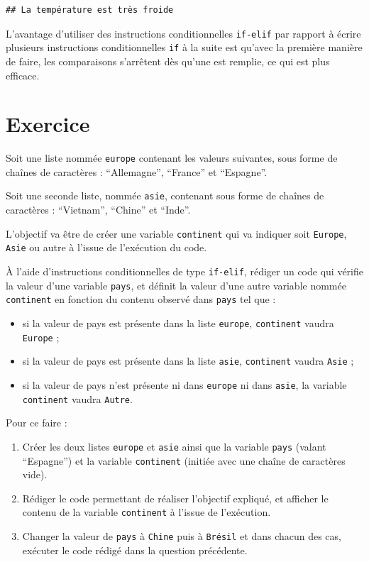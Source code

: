 \documentclass[12pt,]{book}
\providecommand{\tightlist}{%
  \setlength{\itemsep}{0pt}\setlength{\parskip}{0pt}}
\numberwithin{equation}{section}
\numberwithin{countremarque}{section}
\let\BeginKnitrBlock\begin \let\EndKnitrBlock\end
\begin{document}
\begin{lstlisting}
## La température est très froide
\end{lstlisting}

\BeginKnitrBlock{remarque}
L'avantage d'utiliser des instructions conditionnelles \texttt{if-elif}
par rapport à écrire plusieurs instructions conditionnelles \texttt{if}
à la suite est qu'avec la première manière de faire, les comparaisons
s'arrêtent dès qu'une est remplie, ce qui est plus efficace.
\EndKnitrBlock{remarque}

\section{Exercice}\label{exercice-4}

\BeginKnitrBlock{exframe}
Soit une liste nommée \texttt{europe} contenant les valeurs suivantes,
sous forme de chaînes de caractères : ``Allemagne'', ``France'' et
``Espagne''.

Soit une seconde liste, nommée \texttt{asie}, contenant sous forme de
chaînes de caractères : ``Vietnam'', ``Chine'' et ``Inde''.

L'objectif va être de créer une variable \texttt{continent} qui va
indiquer soit \texttt{Europe}, \texttt{Asie} ou autre à l'issue de
l'exécution du code.

À l'aide d'instructions conditionnelles de type \texttt{if-elif},
rédiger un code qui vérifie la valeur d'une variable \texttt{pays}, et
définit la valeur d'une autre variable nommée \texttt{continent} en
fonction du contenu observé dans \texttt{pays} tel que :

\begin{itemize}
\tightlist
\item
  si la valeur de pays est présente dans la liste \texttt{europe},
  \texttt{continent} vaudra \texttt{Europe} ;
\item
  si la valeur de pays est présente dans la liste \texttt{asie},
  \texttt{continent} vaudra \texttt{Asie} ;
\item
  si la valeur de pays n'est présente ni dans \texttt{europe} ni dans
  \texttt{asie}, la variable \texttt{continent} vaudra \texttt{Autre}.
\end{itemize}

Pour ce faire :

\begin{enumerate}
\def\labelenumi{\arabic{enumi}.}
\tightlist
\item
  Créer les deux listes \texttt{europe} et \texttt{asie} ainsi que la
  variable \texttt{pays} (valant ``Espagne'') et la variable
  \texttt{continent} (initiée avec une chaîne de caractères vide).
\item
  Rédiger le code permettant de réaliser l'objectif expliqué, et
  afficher le contenu de la variable \texttt{continent} à l'issue de
  l'exécution.
\item
  Changer la valeur de \texttt{pays} à \texttt{Chine} puis à
  \texttt{Brésil} et dans chacun des cas, exécuter le code rédigé dans
  la question précédente.
\end{enumerate}
\EndKnitrBlock{exframe}
\end{document}
